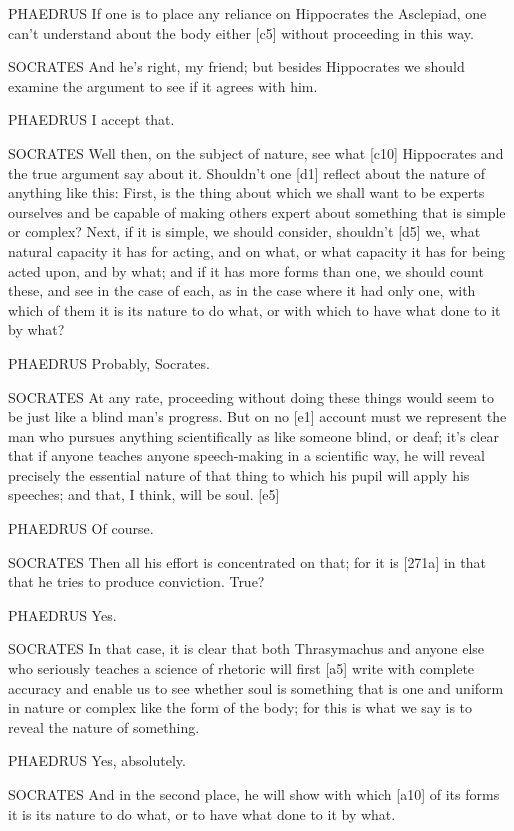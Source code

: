 PHAEDRUS If one is to place any reliance on Hippocrates the
Asclepiad, one can't
understand about the body either {[}c5{]} without proceeding in this
way.

SOCRATES And he's right, my friend; but besides Hippocrates we should
examine the argument to
see if it agrees with him.

PHAEDRUS I accept that.

SOCRATES Well then, on the subject of nature, see what {[}c10{]}
Hippocrates and the true argument say about it. Shouldn't one {[}d1{]}
reflect about the nature of anything like this: First, is the thing
about which we shall want to be experts ourselves and be capable of
making others expert about something that is simple or complex? Next, if
it is simple, we should consider, shouldn't {[}d5{]} we, what natural
capacity it has for acting, and on what, or what capacity it has for
being acted upon, and by what; and if it has more
forms than one, we
should count these, and see in the case of each, as in the case where it
had only one, with which of them it is its nature to do what, or with
which to have what done to it by what?

PHAEDRUS Probably, Socrates.

SOCRATES At any rate, proceeding without doing these things would seem
to be just like a blind man's progress. But on no {[}e1{]} account must
we represent the man who pursues anything scientifically as like someone
blind, or deaf; it's clear that if anyone teaches anyone speech-making
in a scientific way, he will reveal precisely the essential nature of
that thing to which his pupil will apply his speeches; and that, I
think, will be soul. {[}e5{]}

PHAEDRUS Of course.

SOCRATES Then all his effort is concentrated on that; for it is
{[}271a{]} in that that he tries to produce conviction. True?

PHAEDRUS Yes.

SOCRATES In that case, it is clear that both Thrasymachus and anyone
else who seriously teaches a science of rhetoric will first {[}a5{]}
write with complete accuracy and enable us to see whether soul is
something that is one and uniform in nature or complex like the form of
the body; for this is what we say is to reveal the nature of something.

PHAEDRUS Yes, absolutely.

SOCRATES And in the second place, he will show with which {[}a10{]} of
its forms it is its nature to do what, or to have what done to it by
what.

